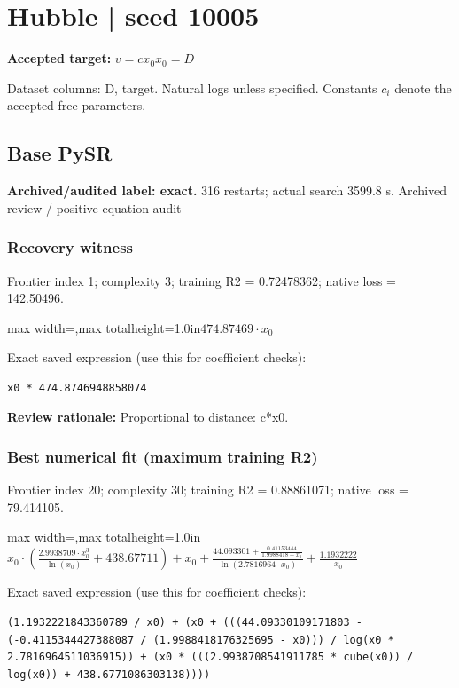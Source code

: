 \documentclass[10pt,letterpaper,landscape]{article}
\begin{document}
\section*{Hubble | seed 10005}
\textbf{Accepted target:} $\displaystyle v=c x_0$\hfill $x_0=D$\par
{\small Dataset columns: D, target. Natural logs unless specified. Constants $c_i$ denote the accepted free parameters.}\par\medskip
\begin{minipage}[t]{0.485\textwidth}
\subsection*{Base PySR}
\textbf{Archived/audited label: exact.} 316 restarts; actual search 3599.8 s.
{\small Archived review / positive-equation audit}
\subsubsection*{Recovery witness}
Frontier index 1; complexity 3; training R2 = 0.72478362; native loss = 142.50496.
\begin{center}\begin{adjustbox}{max width=\linewidth,max totalheight=1.0in}$\displaystyle 474.87469 \cdot x_{0}$\end{adjustbox}\end{center}
{\scriptsize Exact saved expression (use this for coefficient checks):}
\begin{lstlisting}
x0 * 474.8746948858074
\end{lstlisting}
{\small\textbf{Review rationale:} Proportional to distance: c*x0.}
\subsubsection*{Best numerical fit (maximum training R2)}
Frontier index 20; complexity 30; training R2 = 0.88861071; native loss = 79.414105.
\begin{center}\begin{adjustbox}{max width=\linewidth,max totalheight=1.0in}$\displaystyle x_{0} \cdot \left(\frac{2.9938709 \cdot x_{0}^{3}}{\ln{\left(x_{0} \right)}} + 438.67711\right) + x_{0} + \frac{44.093301 + \frac{0.41153444}{1.9988418 - x_{0}}}{\ln{\left(2.7816964 \cdot x_{0} \right)}} + \frac{1.1932222}{x_{0}}$\end{adjustbox}\end{center}
{\scriptsize Exact saved expression (use this for coefficient checks):}
\begin{lstlisting}
(1.1932221843360789 / x0) + (x0 + (((44.09330109171803 - (-0.4115344427388087 / (1.9988418176325695 - x0))) / log(x0 * 2.7816964511036915)) + (x0 * (((2.9938708541911785 * cube(x0)) / log(x0)) + 438.6771086303138))))
\end{lstlisting}
\end{minipage}\hfill
\end{document}
